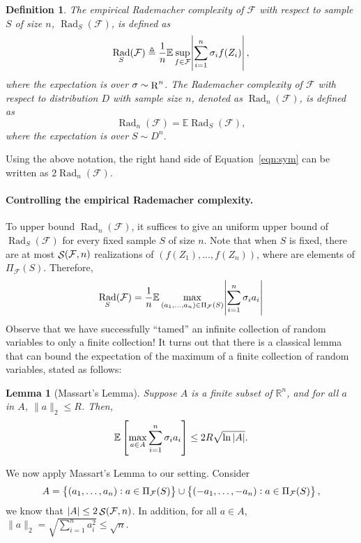 \documentclass{article}
\newtheorem{lemma}{Lemma}
\newtheorem{definition}{Definition}
\DeclareMathOperator{\Rad}{{\mathrm{Rad}}}
\DeclareMathOperator*{\R}{{\rm R}}
\DeclareMathOperator*{\Scal}{{\cal S}}
\newcommand{\RR}{\mathbb{R}} %
\newcommand{\EE}{\mathbb{E}}
\newcommand{\Fcal}{\mathcal{F}}
\newcommand{\defeq}{\triangleq}
\begin{document}
\begin{definition}
The empirical Rademacher complexity of $\Fcal$ with respect to sample $S$ of size $n$, $\Rad_S(\Fcal)$, is defined as
\[ \Rad_S(\Fcal) \defeq \frac{1}{n} \EE \sup_{f \in \Fcal} \abs{\sum_{i=1}^n \sigma_i f(Z_i)}, \]
where the expectation is over $\sigma \sim \R^n$.
The Rademacher complexity of $\Fcal$ with respect to distribution $D$ with sample size $n$, denoted as $\Rad_n(\Fcal)$, is defined as
\[ \Rad_n(\Fcal) = \EE \Rad_S(\Fcal), \]
where the expectation is over $S \sim D^n$.
\end{definition}

Using the above notation, the right hand side of Equation~\eqref{eqn:sym} can be written as $2\Rad_n(\Fcal)$.

\paragraph{Controlling the empirical Rademacher complexity.}
To upper bound $\Rad_n(\Fcal)$, it suffices to give an uniform upper bound of $\Rad_S(\Fcal)$ for every fixed sample $S$ of size $n$.
Note that when $S$ is fixed, there are at most $\Scal(\Fcal, n)$ realizations of
$(f(Z_1), \ldots, f(Z_n))$, where are elements of $\Pi_\Fcal(S)$. Therefore,
\[ \Rad_S(\Fcal) = \frac{1}{n} \EE \max_{(a_1,\ldots,a_n) \in \Pi_\Fcal(S)} \abs{\sum_{i=1}^n \sigma_i a_i} \]
Observe that we have successfully ``tamed'' an infinite collection of random variables to only a finite collection! It turns out that there is a classical lemma that can bound the expectation of the maximum of a finite collection of random variables, stated as follows:

\begin{lemma}[Massart's Lemma]
Suppose $A$ is a finite subset of $\RR^n$, and for all $a$ in $A$, $\|a\|_2 \leq R$. Then,
\[ \EE \sbr{\max_{a \in A} \sum_{i=1}^n \sigma_i a_i} \leq 2 R \sqrt{\ln|A|}. \]
\label{lem:massart}
\end{lemma}

We now apply Massart's Lemma to our setting. Consider
\[ A = \cbr{(a_1,\ldots,a_n): a \in \Pi_\Fcal(S)} \cup \cbr{(-a_1,\ldots,-a_n): a \in \Pi_\Fcal(S)}, \]
we know that $|A| \leq 2 \Scal(\Fcal, n)$. In addition, for all $a \in A$, $\|a\|_2 = \sqrt{\sum_{i=1}^n a_i^2} \leq \sqrt{n}$.
\end{document}
